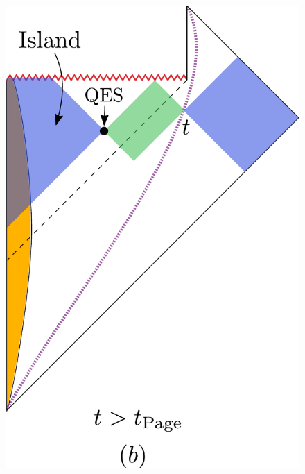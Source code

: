 \begin{figure}[ht]
\begin{center}
\includegraphics[scale=.35]{figures/EWb.pdf}  \ \ \ \ \ \  \ \

\end{center}
\end{figure}
